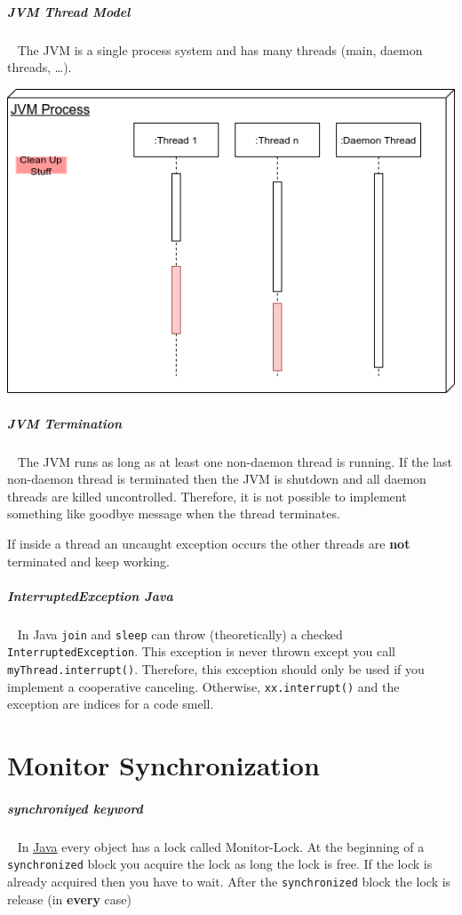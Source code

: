 \documentclass[11pt,twoside,landscape]{article}
\begin{document}
\begin{multicols}{3}
\subparagraph{JVM Thread Model} \
\label{sec:org0ec0ca1}
The JVM is a single process system and has many threads (main, daemon threads, \ldots{}).

{
\begin{center}
\includegraphics[width=.9\linewidth]{img/jvm_thread_model.drawio.png}
\end{center}
\label{fig:the-jvm-thread-model}
}

\subparagraph{JVM Termination} \
\label{sec:org1666cda}
The JVM runs as long as at least one non-daemon thread is running.
If the last non-daemon thread is terminated then the JVM is shutdown and all daemon threads are killed uncontrolled.
Therefore, it is not possible to implement something like goodbye message when the thread terminates.

If inside a thread an uncaught exception occurs the other threads are \textbf{not} terminated and keep working.

\subparagraph{InterruptedException Java} \
\label{sec:org3cedd89}
In Java \texttt{join} and \texttt{sleep} can throw (theoretically) a checked \texttt{InterruptedException}.
This exception is never thrown except you call \texttt{myThread.interrupt()}.
Therefore, this exception should only be used if you implement a cooperative canceling.
Otherwise, \texttt{xx.interrupt()} and the exception are indices for a code smell.

\section{Monitor Synchronization}
\label{sec:orgdb29100}
\subparagraph{synchroniyed keyword} \
\label{sec:org53d5174}
In \href{../../../roam/20201116150053-java.org}{Java} every object has a lock called Monitor-Lock.
At the beginning of a \texttt{synchronized} block you acquire the lock as long the lock is free.
If the lock is already acquired then you have to wait.
After the \texttt{synchronized} block the lock is release (in \textbf{every} case)


\end{multicols}
\end{document}

